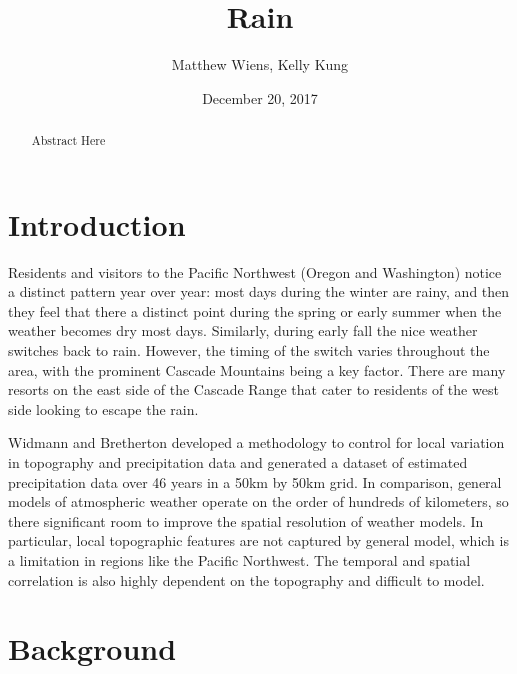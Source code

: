 \documentclass{article}
\begin{document}
\title{Rain}
\author{Matthew Wiens, Kelly Kung}
\date{December 20, 2017}
\maketitle
\begin{abstract}
Abstract Here
\end{abstract}

\section{Introduction}

Residents and visitors to the Pacific Northwest (Oregon and Washington) notice a distinct pattern year over year: most days during the winter are rainy, and then they feel that there a distinct point during the spring or early summer when the weather becomes dry most days. Similarly, during early fall the nice weather switches back to rain.  However, the timing of the switch varies throughout the area, with the prominent Cascade Mountains being a key factor. There are many resorts on the east side of the Cascade Range that cater to residents of the west side looking to escape the rain. 

Widmann and Bretherton developed a methodology to control for local variation in topography and precipitation data and generated a dataset of estimated precipitation data over 46 years in a 50km by 50km grid.  In comparison, general models of atmospheric weather operate on the order of hundreds of kilometers, so there significant room to improve the spatial resolution of weather models.  In particular, local topographic features are not captured by general model, which is a limitation in regions like the Pacific Northwest.
The temporal and spatial correlation is also highly dependent on the topography and difficult to model. 

\section{Background}

\end{document}
